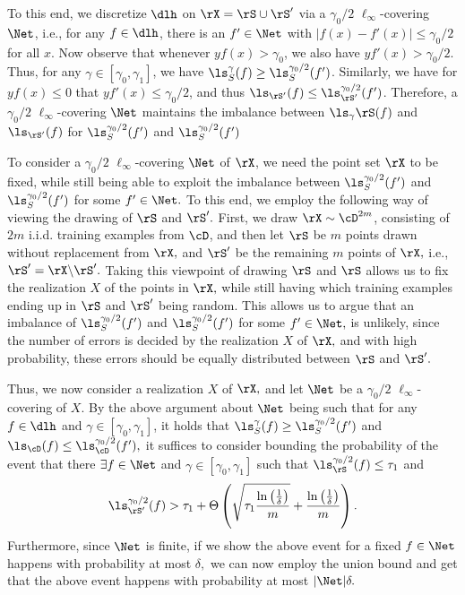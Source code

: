  To this end, we discretize $\dlh$ on $ \rX=\rS\cup\rS' $  via a $\gamma_0/2$ $\ell_\infty$-covering $ \Net $, i.e., for any $f \in \dlh$, there is an $f' \in \Net$ with $|f(x)-f'(x)| \leq \gamma_0/2$ for all $x$. Now observe that whenever $yf(x) > \gamma_0$, we also have $yf'(x) > \gamma_0/2$. Thus, for any $\gamma \in [\gamma_0,\gamma_1]$, we have $\ls_S^\gamma(f) \geq \ls_S^{\gamma_0/2}(f')$. Similarly, we have for $yf(x) \leq 0$ that $yf'(x) \leq \gamma_0/2$, and thus $\ls_{\rS'}(f) \leq \ls_{\rS'}^{\gamma_0/2}(f')$. Therefore, a $\gamma_0/2$ $\ell_\infty$-covering $ \Net $ maintains the imbalance between $ \ls_{\gamma}{\rS}(f) $ and $ \ls_{\rS'}(f)$ for $ \ls_S^{\gamma_0/2}(f') $ and $ \ls_S^{\gamma_0/2}(f') $   
 
 To consider a $\gamma_0/2$ $\ell_\infty$-covering $ \Net $ of $ \rX $, we need the point set $ \rX $ to be fixed, while still being able to exploit the imbalance between $ \ls_S^{\gamma_0/2}(f') $ and $ \ls_S^{\gamma_0/2}(f')$ for some $ f'\in \Net.$ To this end, we employ the following way of viewing the drawing of $ \rS $ and $ \rS'.$ First, we draw $ \rX\sim \cD^{2m} $, consisting of $ 2m $ i.i.d. training examples from $ \cD $, and then let $ \rS $ be $ m $ points drawn without replacement from $ \rX,$ and $ \rS' $ be the remaining $ m $  points of $ \rX,$ i.e., $ \rS'=\rX\backslash \rS'.$ Taking this viewpoint of drawing $ \rS $ and $ \rS $ allows us to fix the realization $ X $ of the points in $ \rX,$ while still having which training examples ending up in $ \rS $ and $ \rS' $ being random. This allows us to argue that an imbalance of $ \ls_S^{\gamma_0/2}(f') $ and $ \ls_S^{\gamma_0/2}(f')$ for some $ f'\in \Net,$ is unlikely, since the number of errors is decided by the realization $ X$ of $ \rX, $ and with high probability, these errors should be equally distributed between $ \rS $ and $ \rS'.$

 Thus, we now consider a realization $ X $ of $ \rX, $ and let $ \Net $ be a $\gamma_0/2$ $\ell_\infty$-covering of $ X. $  
By the above argument about $ \Net $ being such that for any $ f\in \dlh $ and $ \gamma\in [\gamma_{0},\gamma_{1}] $, it holds that $\ls_S^\gamma(f) \geq \ls_S^{\gamma_0/2}(f')$ and $\ls_\cD(f) \leq \ls_{\cD}^{\gamma_0/2}(f'),$ it suffices to consider bounding the probability of the event that there $ \exists f\in \Net $ and $ \gamma\in [\gamma_{0},\gamma_{1}] $ such that $ \ls_{\rS}^{\gamma_{0}/2}(f)\leq \tau_{1} $ and 
\begin{align}\label{eq:proofsketch6}
\ls^{\gamma_{0}/2}_{\rS'}(f)> \tau_{1}+\Theta\left(\sqrt{\tau_{1}\frac{\ln{\left(\frac{1}{\delta}\right)}}{m} }+\frac{\ln{\left(\frac{1}{\delta}\right)}}{m} \right).
\end{align}            
Furthermore, since $ \Net $ is finite, if we show the above event for a fixed $ f \in \Net$ happens with probability at most $ \delta,$ we can now employ the union bound and get that the above event happens with probability at most $ |\Net|\delta.$

